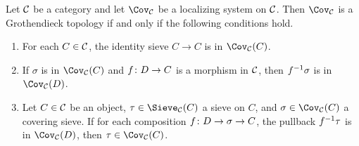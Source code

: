 \documentclass[10pt]{amsart}
\begin{document}
\begin{lemma}

Let $\mathcal{C}$ be a category and let $\Cov_\mcC$ be a localizing system on $\mathcal{C}$.  Then $\Cov_\mcC$ is a Grothendieck topology if and
only if the following conditions hold. \begin{enumerate} \item For each $C\in\mathcal{C}$, the identity sieve $C\to C$ is in
$\Cov_\mcC(C)$.\item If $\sigma$ is in $\Cov_\mcC(C)$ and $f\colon D\rightarrow C$ is a morphism in $\mathcal{C}$, then $f^\m1\sigma$ is in
$\Cov_\mcC(D)$. \item Let $C\in\mathcal{C}$ be an object, $\tau\in\Sieve_\mcC(C)$ a sieve on $C$, and $\sigma\in\Cov_\mcC(C)$ a
covering sieve.  If for each composition $f\colon D\rightarrow\sigma\rightarrow C$, the pullback $f^\m1\tau$ is in $\Cov_\mcC(D)$, then
$\tau\in\Cov_\mcC(C)$.\end{enumerate}

\end{lemma}
\end{document}
